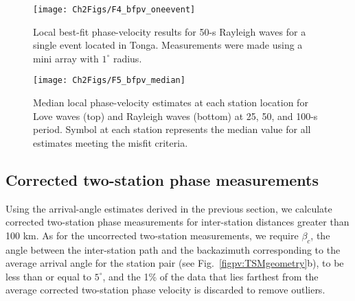 \documentclass[12pt,oneside]{book}
\newcommand{\degree}[1]{\mbox{$#1^{\circ}$}}
\begin{document}
\begin{figure} 
\begin{center}
\texttt{[image: Ch2Figs/F4\_bfpv\_oneevent]} 
\caption[Local phase-velocity results for a single event]{Local best-fit phase-velocity results for 50-s Rayleigh waves for a single event located in Tonga. Measurements were made using a mini array with \degree{1} radius. }
\label{figpv:bfpv_evt}
\end{center}
\end{figure}
%
\begin{figure} 
\begin{center}
\texttt{[image: Ch2Figs/F5\_bfpv\_median]} 
\caption[Local phase-velocity maps from mini-array method]{Median local phase-velocity estimates at each station location for Love waves (top) and Rayleigh waves (bottom) at 25, 50, and 100-s period. Symbol at each station represents the median value for all estimates meeting the misfit criteria. }
\label{figpv:bfpv_all}
\end{center}
\end{figure}
%

\subsection{Corrected two-station phase measurements}\label{sec:analysiscorrtsm}
Using the arrival-angle estimates derived in the previous section, we calculate corrected two-station phase measurements for inter-station distances greater than 100 km. As for the uncorrected two-station measurements, we require $\beta_{c}$, the angle between the inter-station path and the backazimuth corresponding to the average arrival angle for the station pair (see Fig.~\ref{figpv:TSMgeometry}b), to be less than or equal to \degree{5}, and the 1\% of the data that lies farthest from the average corrected two-station phase velocity is discarded to remove outliers. 
\end{document}
